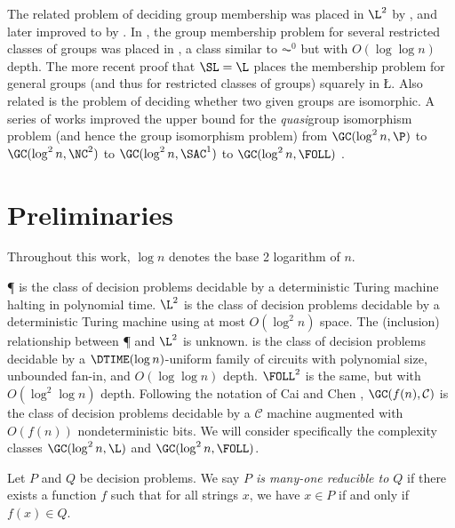 \documentclass{article}
\begin{document}
The related problem of deciding group membership was placed in $\L^2$ by \cite{lsz77}, and later improved to \SL{} by \cite{bm89}.
In \cite{bklm01}, the group membership problem for several restricted classes of groups was placed in \FOLL, a class similar to $\AC^0$ but with $O(\log \log n)$ depth.
The more recent proof that $\SL = \L$ \cite{reingold08} places the membership problem for general groups (and thus for restricted classes of groups) squarely in \L.
Also related is the problem of deciding whether two given groups are isomorphic.
A series of works improved the upper bound for the \emph{quasi}group isomorphism problem (and hence the group isomorphism problem) from $\GC(\log^2 n, \P)$ \cite{py96} to $\GC(\log^2 n, \NC^2)$ \cite{wolf94} to $\GC(\log^2 n, \SAC^1)$ \cite{wagner10} to $\GC(\log^2 n, \FOLL)$ \cite{ctw10}.

\section{Preliminaries}\label{sec:prelim}

Throughout this work, $\log n$ denotes the base 2 logarithm of $n$.

\P{} is the class of decision problems decidable by a deterministic Turing machine halting in polynomial time.
$\L^2$ is the class of decision problems decidable by a deterministic Turing machine using at most $O(\log^2 n)$ space.
The (inclusion) relationship between \P{} and $\L^2$ is unknown.
\FOLL{} is the class of decision problems decidable by a $\DTIME(\log n)$-uniform family of circuits with polynomial size, unbounded fan-in, and $O(\log \log n)$ depth.
$\FOLL^2$ is the same, but with $O(\log^2 \log n)$ depth.
Following the notation of Cai and Chen \cite{cc97}, $\GC(f(n), \mathcal{C})$ is the class of decision problems decidable by a $\mathcal{C}$ machine augmented with $O(f(n))$ nondeterministic bits.
We will consider specifically the complexity classes $\GC(\log^2 n, \L)$ and $\GC(\log^2 n, \FOLL)$.

Let $P$ and $Q$ be decision problems.
We say \emph{$P$ is many-one reducible to $Q$} if there exists a function $f$ such that for all strings $x$, we have $x \in P$ if and only if $f(x) \in Q$.
\end{document}
